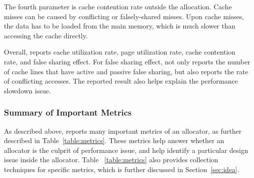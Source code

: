 The fourth parameter is cache contention rate outside the allocation. Cache misses can be caused by conflicting or falsely-shared misses. Upon cache misses, the data has to be loaded from the main memory, which is much slower than accessing the cache directly. 

Overall, \MP{} reports cache utilization rate, page utilization rate, cache contention rate, and false sharing effect. For false sharing effect, \MP{} not only reports the number of cache lines that have active and passive false sharing, but also reports the rate of conflicting accesses. The reported result also helps explain the performance slowdown issue. 

\subsubsection{Summary of Important Metrics}

As described above, \MP{} reports many important metrics of an allocator, as further described in Table~\ref{table:metrics}. These metrics help answer whether an allocator is the culprit of performance issue, and help identify a particular design issue inside the allocator. Table ~\ref{table:metrics} also provides collection techniques for specific metrics, which is further discussed in Section~\ref{sec:idea}. 

